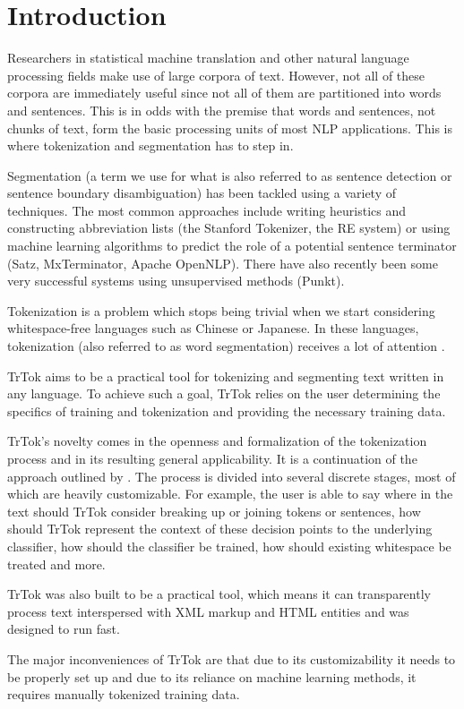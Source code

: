\section{Introduction}
\label{sec:introduction}

Researchers in statistical machine translation and other natural
language processing fields make use of large corpora of text. However,
not all of these corpora are immediately useful since not all of them
are partitioned into words and sentences. This is in odds with the
premise that words and sentences, not chunks of text, form the basic
processing units of most NLP applications. This is where tokenization
and segmentation has to step in.

Segmentation (a term we use for what is also referred to as sentence
detection or sentence boundary disambiguation) has been tackled using
a variety of techniques. The most common approaches include writing
heuristics and constructing abbreviation lists (the Stanford
Tokenizer, the RE system) or using machine learning algorithms to
predict the role of a potential sentence terminator (Satz,
MxTerminator, Apache OpenNLP). There have also recently been some very
successful systems using unsupervised methods (Punkt).

Tokenization is a problem which stops being trivial when we start
considering whitespace-free languages such as Chinese or Japanese. In
these languages, tokenization (also referred to as word segmentation)
receives a lot of attention \cite{seg-bakeoff}.

TrTok aims to be a practical tool for tokenizing and segmenting text
written in any language. To achieve such a goal, TrTok relies on the
user determining the specifics of training and tokenization and
providing the necessary training data.

TrTok's novelty comes in the openness and formalization of the
tokenization process and in its resulting general applicability. It is
a continuation of the approach outlined by \citet{sbd-trtok-orig}. The
process is divided into several discrete stages, most of which are
heavily customizable. For example, the user is able to say where in
the text should TrTok consider breaking up or joining tokens or
sentences, how should TrTok represent the context of these decision
points to the underlying classifier, how should the classifier be
trained, how should existing whitespace be treated and more.

TrTok was also built to be a practical tool, which means it can
transparently process text interspersed with XML markup and HTML
entities and was designed to run fast.

The major inconveniences of TrTok are that due to its customizability
it needs to be properly set up and due to its reliance on machine
learning methods, it requires manually tokenized training data.
